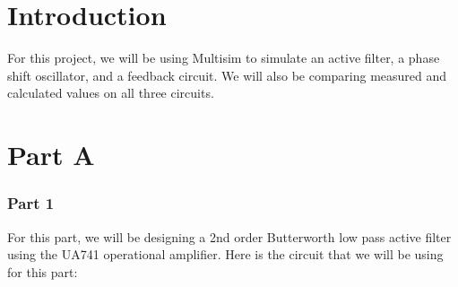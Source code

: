 \documentclass[12pt]{article}
\begin{document}
\pagebreak
{}
\tableofcontents
\pagebreak
\listoffigures
\listoftables
\pagebreak
{}


\section{Introduction}
For this project, we will be using Multisim to simulate an active filter, a phase shift oscillator, and a feedback circuit. 
We will also be comparing measured and calculated values on all three circuits. 
\section{Part A}
\subsubsection{Part 1}
For this part, we will be designing a 2nd order Butterworth low pass active filter using the UA741 operational amplifier. 
Here is the circuit that we will be using for this part:
\end{document}
